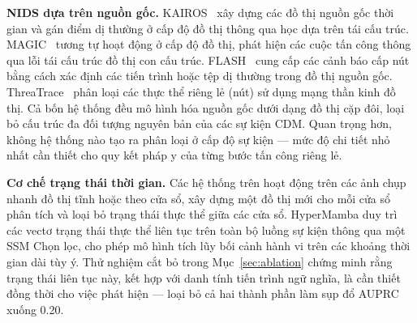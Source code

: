 \documentclass[letterpaper,twocolumn,10pt]{article}
\begin{document}
\begin{table}[t]
    \centering
    \caption{Định vị HyperMamba so với các NIDS dựa trên nguồn gốc trên ba trục.}
    \label{tab:positioning}
\end{table}

\textbf{NIDS dựa trên nguồn gốc.} KAIROS~\cite{cheng2024kairos} xây dựng các đồ thị nguồn gốc thời gian và gán điểm dị thường ở cấp độ đồ thị thông qua học dựa trên tái cấu trúc. MAGIC~\cite{jia2024magic} tương tự hoạt động ở cấp độ đồ thị, phát hiện các cuộc tấn công thông qua lỗi tái cấu trúc đồ thị con cấu trúc. FLASH~\cite{rehman2024flash} cung cấp các cảnh báo cấp nút bằng cách xác định các tiến trình hoặc tệp dị thường trong đồ thị nguồn gốc. ThreaTrace~\cite{Wang2021THREATRACEDA} phân loại các thực thể riêng lẻ (nút) sử dụng mạng thần kinh đồ thị. Cả bốn hệ thống đều mô hình hóa nguồn gốc dưới dạng đồ thị cặp đôi, loại bỏ cấu trúc đa đối tượng nguyên bản của các sự kiện CDM. Quan trọng hơn, không hệ thống nào tạo ra phân loại ở cấp độ sự kiện --- mức độ chi tiết nhỏ nhất cần thiết cho quy kết pháp y của từng bước tấn công riêng lẻ.

\textbf{Cơ chế trạng thái thời gian.} Các hệ thống trên hoạt động trên các ảnh chụp nhanh đồ thị tĩnh hoặc theo cửa sổ, xây dựng một đồ thị mới cho mỗi cửa sổ phân tích và loại bỏ trạng thái thực thể giữa các cửa sổ. HyperMamba duy trì các vectơ trạng thái thực thể liên tục trên toàn bộ luồng sự kiện thông qua một SSM Chọn lọc, cho phép mô hình tích lũy bối cảnh hành vi trên các khoảng thời gian dài tùy ý. Thử nghiệm cắt bỏ trong Mục~\ref{sec:ablation} chứng minh rằng trạng thái liên tục này, kết hợp với danh tính tiến trình ngữ nghĩa, là cần thiết đồng thời cho việc phát hiện --- loại bỏ cả hai thành phần làm sụp đổ AUPRC xuống 0.20.
\end{document}
